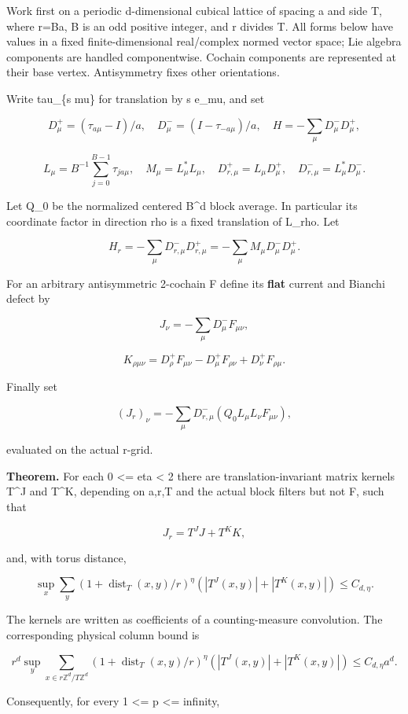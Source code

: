 \documentclass[
  11pt,
]{article}
\begin{document}
Work first on a periodic d-dimensional cubical lattice of spacing a and
side T, where r=Ba, B is an odd positive integer, and r divides T. All
forms below have values in a fixed finite-dimensional real/complex
normed vector space; Lie algebra components are handled componentwise.
Cochain components are represented at their base vertex. Antisymmetry
fixes other orientations.

Write tau\_\{s mu\} for translation by s e\_mu, and set

\[
D_\mu^+=(\tau_{a\mu}-I)/a,\quad
D_\mu^-=(I-\tau_{-a\mu})/a,\quad
H=-\sum_\mu D_\mu^-D_\mu^+,
\]

\[
L_\mu=B^{-1}\sum_{j=0}^{B-1}\tau_{ja\mu},\quad
M_\mu=L_\mu^*L_\mu,\quad
D_{r,\mu}^+=L_\mu D_\mu^+,\quad
D_{r,\mu}^-=L_\mu^*D_\mu^-.
\]

Let Q\_0 be the normalized centered B\^{}d block average. In particular
its coordinate factor in direction rho is a fixed translation of L\_rho.
Let

\[
H_r=-\sum_\mu D_{r,\mu}^-D_{r,\mu}^+
    =-\sum_\mu M_\mu D_\mu^-D_\mu^+.
\]

For an arbitrary antisymmetric 2-cochain F define its \textbf{flat}
current and Bianchi defect by

\[
J_\nu=-\sum_\mu D_\mu^-F_{\mu\nu},
\]

\[
K_{\rho\mu\nu}
=D_\rho^+F_{\mu\nu}-D_\mu^+F_{\rho\nu}+D_\nu^+F_{\rho\mu}.
\]

Finally set

\[
(J_r)_\nu=-\sum_\mu D_{r,\mu}^-(Q_0L_\mu L_\nu F_{\mu\nu}),
\]

evaluated on the actual r-grid.

\textbf{Theorem.} For each 0 \textless= eta \textless{} 2 there are
translation-invariant matrix kernels T\^{}J and T\^{}K, depending on
a,r,T and the actual block filters but not F, such that

\[
J_r=T^J J+T^K K,
\]

and, with torus distance,

\[
\sup_x\sum_y (1+\operatorname{dist}_T(x,y)/r)^\eta
 (|T^J(x,y)|+|T^K(x,y)|)\le C_{d,\eta}.
\tag{MA1}
\]

The kernels are written as coefficients of a counting-measure
convolution. The corresponding physical column bound is

\[
r^d\sup_y\sum_{x\in r\mathbb Z^d/T\mathbb Z^d}
 (1+\operatorname{dist}_T(x,y)/r)^\eta
 (|T^J(x,y)|+|T^K(x,y)|)
\le C_{d,\eta}a^d.
\tag{MA2}
\]

Consequently, for every 1 \textless= p \textless= infinity,
\end{document}
